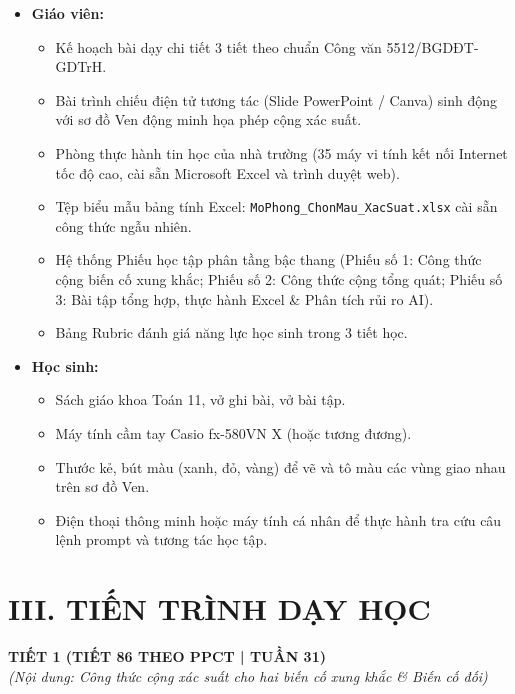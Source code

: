 \documentclass[12pt, a4paper]{article}
\begin{document}
\begin{itemize}[leftmargin=1.2cm]
    \item \textbf{Giáo viên:}
    \begin{itemize}[leftmargin=0.6cm]
        \item Kế hoạch bài dạy chi tiết 3 tiết theo chuẩn Công văn 5512/BGDĐT-GDTrH.
        \item Bài trình chiếu điện tử tương tác (Slide PowerPoint / Canva) sinh động với sơ đồ Ven động minh họa phép cộng xác suất.
        \item Phòng thực hành tin học của nhà trường (35 máy vi tính kết nối Internet tốc độ cao, cài sẵn Microsoft Excel và trình duyệt web).
        \item Tệp biểu mẫu bảng tính Excel: \texttt{MoPhong\_ChonMau\_XacSuat.xlsx} cài sẵn công thức ngẫu nhiên.
        \item Hệ thống Phiếu học tập phân tầng bậc thang (Phiếu số 1: Công thức cộng biến cố xung khắc; Phiếu số 2: Công thức cộng tổng quát; Phiếu số 3: Bài tập tổng hợp, thực hành Excel \& Phân tích rủi ro AI).
        \item Bảng Rubric đánh giá năng lực học sinh trong 3 tiết học.
    \end{itemize}
    \item \textbf{Học sinh:}
    \begin{itemize}[leftmargin=0.6cm]
        \item Sách giáo khoa Toán 11, vở ghi bài, vở bài tập.
        \item Máy tính cầm tay Casio fx-580VN X (hoặc tương đương).
        \item Thước kẻ, bút màu (xanh, đỏ, vàng) để vẽ và tô màu các vùng giao nhau trên sơ đồ Ven.
        \item Điện thoại thông minh hoặc máy tính cá nhân để thực hành tra cứu câu lệnh prompt và tương tác học tập.
    \end{itemize}
\end{itemize}

\section*{III. TIẾN TRÌNH DẠY HỌC}

\begin{center}
    \textbf{\large TIẾT 1 (TIẾT 86 THEO PPCT | TUẦN 31)}\\[4pt]
    \textit{(Nội dung: Công thức cộng xác suất cho hai biến cố xung khắc \& Biến cố đối)}
\end{center}
\end{document}

